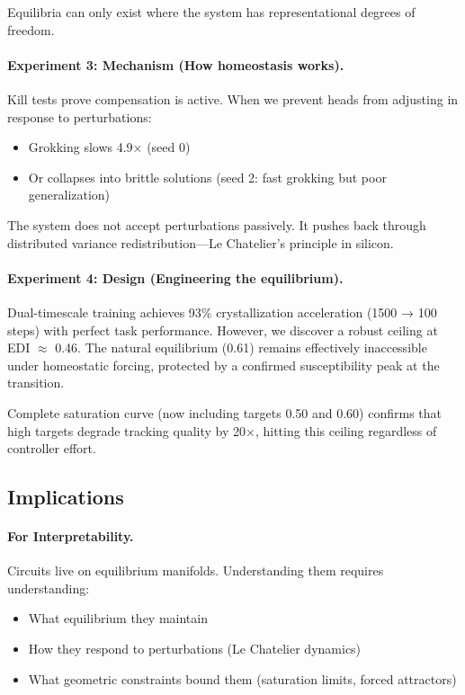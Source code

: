 Equilibria can only exist where the system has representational degrees of freedom.

\paragraph{Experiment 3: Mechanism (How homeostasis works).}
Kill tests prove compensation is active. When we prevent heads from adjusting in response to perturbations:
\begin{itemize}
\item Grokking slows 4.9× (seed 0)
\item Or collapses into brittle solutions (seed 2: fast grokking but poor generalization)
\end{itemize}

The system does not accept perturbations passively. It pushes back through distributed variance redistribution—Le Chatelier's principle in silicon.

\paragraph{Experiment 4: Design (Engineering the equilibrium).}
Dual-timescale training achieves 93\% crystallization acceleration (1500 → 100 steps) with perfect task performance. However, we discover a robust ceiling at EDI $\approx$ 0.46. The natural equilibrium (0.61) remains effectively inaccessible under homeostatic forcing, protected by a confirmed susceptibility peak at the transition.

Complete saturation curve (now including targets 0.50 and 0.60) confirms that high targets degrade tracking quality by 20×, hitting this ceiling regardless of controller effort.

\subsection{Implications}

\paragraph{For Interpretability.}
Circuits live on equilibrium manifolds. Understanding them requires understanding:
\begin{itemize}
\item What equilibrium they maintain
\item How they respond to perturbations (Le Chatelier dynamics)
\item What geometric constraints bound them (saturation limits, forced attractors)
\end{itemize}


